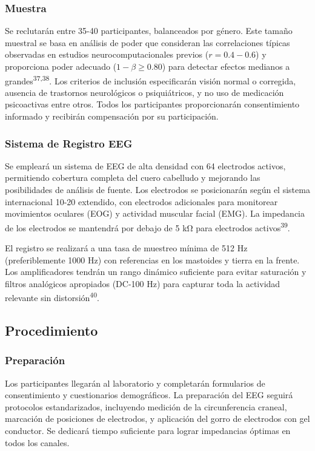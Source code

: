 \documentclass[
  spanish,
  10pt,
]{article}
\begin{document}
\subsubsection{Muestra}\label{muestra}

Se reclutarán entre 35-40 participantes, balanceados por género. Este
tamaño muestral se basa en análisis de poder que consideran las
correlaciones típicas observadas en estudios neurocomputacionales
previos (\(r = 0.4-0.6\)) y proporciona poder adecuado
(\(1-\beta \geq 0.80\)) para detectar efectos medianos a
grandes\textsuperscript{37,38}. Los criterios de inclusión especificarán
visión normal o corregida, ausencia de trastornos neurológicos o
psiquiátricos, y no uso de medicación psicoactivas entre otros. Todos
los participantes proporcionarán consentimiento informado y recibirán
compensación por su participación.

\subsubsection{Sistema de Registro EEG}\label{sistema-de-registro-eeg}

Se empleará un sistema de EEG de alta densidad con 64 electrodos
activos, permitiendo cobertura completa del cuero cabelludo y mejorando
las posibilidades de análisis de fuente. Los electrodos se posicionarán
según el sistema internacional 10-20 extendido, con electrodos
adicionales para monitorear movimientos oculares (EOG) y actividad
muscular facial (EMG). La impedancia de los electrodos se mantendrá por
debajo de 5 kΩ para electrodos activos\textsuperscript{39}.

El registro se realizará a una tasa de muestreo mínima de 512 Hz
(preferiblemente 1000 Hz) con referencias en los mastoides y tierra en
la frente. Los amplificadores tendrán un rango dinámico suficiente para
evitar saturación y filtros analógicos apropiados (DC-100 Hz) para
capturar toda la actividad relevante sin distorsión\textsuperscript{40}.

\subsection{Procedimiento}\label{procedimiento}

\subsubsection{Preparación}\label{preparaciuxf3n}

Los participantes llegarán al laboratorio y completarán formularios de
consentimiento y cuestionarios demográficos. La preparación del EEG
seguirá protocolos estandarizados, incluyendo medición de la
circunferencia craneal, marcación de posiciones de electrodos, y
aplicación del gorro de electrodos con gel conductor. Se dedicará tiempo
suficiente para lograr impedancias óptimas en todos los canales.
\end{document}
